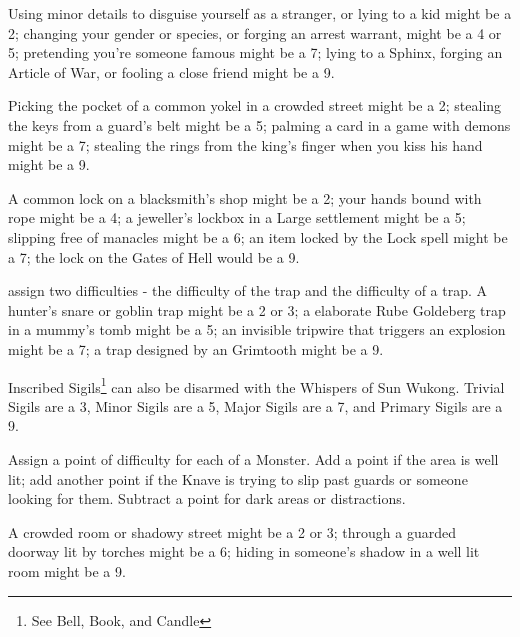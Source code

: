 {\begin{multicols}{2}
      Using minor details to disguise yourself as a stranger, or lying to a kid might be a 2; changing your gender or species, or forging an arrest warrant, might be a 4 or 5; pretending you're someone famous might be a 7; lying to a Sphinx, forging an Article of War, or fooling a close friend might be a 9.



     Picking the pocket of a common yokel in a crowded street might be a 2; stealing the keys from a guard's belt might be a 5; palming a card in a game with demons might be a 7; stealing the rings from the king's finger when you kiss his hand might be a 9.




       A common lock on a blacksmith's shop might be a 2; your hands bound with rope might be a 4; a jeweller's lockbox in a Large settlement might be a 5; slipping free of manacles might be a 6;  an item locked by the Lock spell might be a 7; the lock on the Gates of Hell would be a 9.

        assign two difficulties - the difficulty of  the trap and the difficulty of  a trap.  A hunter's snare or goblin trap might be a 2 or 3; a elaborate Rube Goldeberg trap in a mummy's tomb might be a 5; an invisible tripwire that triggers an explosion might be a 7; a trap designed by an Grimtooth might be a 9.

      Inscribed Sigils\footnote{See Bell, Book, and Candle} can also be disarmed with the Whispers of Sun Wukong. Trivial Sigils are a 3, Minor Sigils are a 5, Major Sigils are a 7, and Primary Sigils are a 9.


  
     Assign a point of difficulty for each \HD of a Monster.  Add a point if the area is well lit; add another point if the Knave is trying to slip past guards or someone looking for them.  Subtract a point for dark areas or distractions.

    A crowded room or shadowy street might be a 2 or 3; through a guarded doorway lit by torches might be a 6; hiding in someone's shadow in a well lit room might be a 9.




\end{multicols}}
